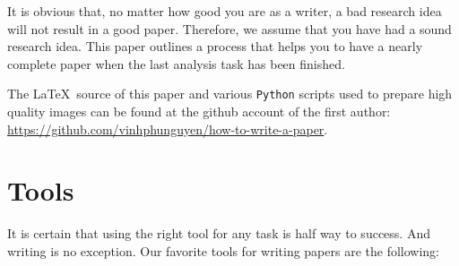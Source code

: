 \documentclass[authoryear,12pta4paper,fleqn]{article}
\numberwithin{equation}{section}
\theoremstyle{remark}
\begin{document}
It is obvious that, no matter how good you are as a writer, a bad research idea will not result in a good paper. Therefore, we  assume that you have had a  sound research idea. This paper outlines a process that helps you to have a nearly complete paper when the last analysis task has been finished.  

The \LaTeX\ source of this paper and various \texttt{Python} scripts used to prepare high quality images can be found at the github account of the first author: \url{https://github.com/vinhphunguyen/how-to-write-a-paper}.


\section{Tools}\label{sec:tools}

It is certain that using the right tool for any task is half way to success. And writing is no exception. Our favorite tools for writing papers are the following:
\end{document}
